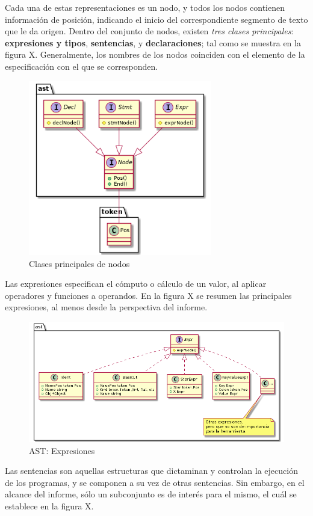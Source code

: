 Cada una de estas representaciones es un nodo, y todos los nodos contienen información de posición,
indicando el inicio del correspondiente segmento de texto que le da origen.
Dentro del conjunto de nodos, existen \textit{tres clases principales}: \textbf{expresiones y tipos},
\textbf{sentencias}, y \textbf{declaraciones}; tal como se muestra en la figura X.
Generalmente, los nombres de los nodos coinciden con el elemento de la especificación con el que
se corresponden.

\begin{figure}[H]
  \includegraphics[width=8cm]{implementation/ast_nodes.png}
  \centering
  \caption{Clases principales de nodos}
\end{figure}

Las expresiones especifican el cómputo o cálculo de un valor, al aplicar operadores y funciones
a operandos.
En la figura X se resumen las principales expresiones, al menos desde la perspectiva
del informe.

\begin{figure}[H]
  \includegraphics[width=12cm]{implementation/ast_exprs.png}
  \centering
  \caption{AST: Expresiones}
\end{figure}

Las sentencias son aquellas estructuras que dictaminan y controlan la ejecución de los programas,
y se componen a su vez de otras sentencias.
Sin embargo, en el alcance del informe, sólo un subconjunto es de interés para el mismo,
el cuál se establece en la figura X. 

